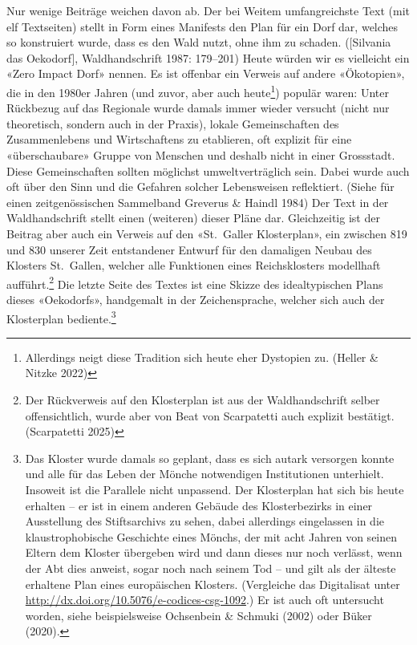 \documentclass[a4paper,
fontsize=11pt,
oneside,
numbers=noperiodatend,
parskip=half-,
bibliography=totoc,
final
]{scrartcl}
\begin{document}
Nur wenige Beiträge weichen davon ab. Der bei Weitem umfangreichste Text
(mit elf Textseiten) stellt in Form eines Manifests den Plan für ein
Dorf dar, welches so konstruiert wurde, dass es den Wald nutzt, ohne ihm
zu schaden. ({[}Silvania das Oekodorf{]}, Waldhandschrift 1987:
179--201) Heute würden wir es vielleicht ein «Zero Impact Dorf» nennen.
Es ist offenbar ein Verweis auf andere «Ökotopien», die in den 1980er
Jahren (und zuvor, aber auch heute\footnote{Allerdings neigt diese
  Tradition sich heute eher Dystopien zu. (Heller \& Nitzke 2022)})
populär waren: Unter Rückbezug auf das Regionale wurde damals immer
wieder versucht (nicht nur theoretisch, sondern auch in der Praxis),
lokale Gemeinschaften des Zusammenlebens und Wirtschaftens zu
etablieren, oft explizit für eine «überschaubare» Gruppe von Menschen
und deshalb nicht in einer Grossstadt. Diese Gemeinschaften sollten
möglichst umweltverträglich sein. Dabei wurde auch oft über den Sinn und
die Gefahren solcher Lebensweisen reflektiert. (Siehe für einen
zeitgenössischen Sammelband Greverus \& Haindl 1984) Der Text in der
Waldhandschrift stellt einen (weiteren) dieser Pläne dar. Gleichzeitig
ist der Beitrag aber auch ein Verweis auf den «St.~Galler Klosterplan»,
ein zwischen 819 und 830 unserer Zeit entstandener Entwurf für den
damaligen Neubau des Klosters St.~Gallen, welcher alle Funktionen eines
Reichsklosters modellhaft aufführt.\footnote{Der Rückverweis auf den
  Klosterplan ist aus der Waldhandschrift selber offensichtlich, wurde
  aber von Beat von Scarpatetti auch explizit bestätigt. (Scarpatetti
  2025)} Die letzte Seite des Textes ist eine Skizze des idealtypischen
Plans dieses «Oekodorfs», handgemalt in der Zeichensprache, welcher sich
auch der Klosterplan bediente.\footnote{Das Kloster wurde damals so
  geplant, dass es sich autark versorgen konnte und alle für das Leben
  der Mönche notwendigen Institutionen unterhielt. Insoweit ist die
  Parallele nicht unpassend. Der Klosterplan hat sich bis heute erhalten
  -- er ist in einem anderen Gebäude des Klosterbezirks in einer
  Ausstellung des Stiftsarchivs zu sehen, dabei allerdings eingelassen
  in die klaustrophobische Geschichte eines Mönchs, der mit acht Jahren
  von seinen Eltern dem Kloster übergeben wird und dann dieses nur noch
  verlässt, wenn der Abt dies anweist, sogar noch nach seinem Tod -- und
  gilt als der älteste erhaltene Plan eines europäischen Klosters.
  (Vergleiche das Digitalisat unter
  \url{http://dx.doi.org/10.5076/e-codices-csg-1092}.) Er ist auch oft
  untersucht worden, siehe beispielsweise Ochsenbein \& Schmuki (2002)
  oder Büker (2020).}
\end{document}
